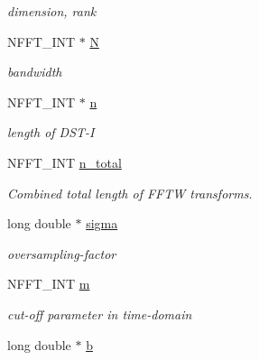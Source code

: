 \begin{DoxyCompactItemize}
\begin{DoxyCompactList}\small\item\em dimension, rank \end{DoxyCompactList}\item 
\hypertarget{structnfstl__plan_a8d9c4a80538b09056e0b2fdca9056042}{N\-F\-F\-T\-\_\-\-I\-N\-T $\ast$ \hyperlink{structnfstl__plan_a8d9c4a80538b09056e0b2fdca9056042}{N}}\label{structnfstl__plan_a8d9c4a80538b09056e0b2fdca9056042}

\begin{DoxyCompactList}\small\item\em bandwidth \end{DoxyCompactList}\item 
\hypertarget{structnfstl__plan_a9106781fac461a0c0b5e5699ba15cbf1}{N\-F\-F\-T\-\_\-\-I\-N\-T $\ast$ \hyperlink{structnfstl__plan_a9106781fac461a0c0b5e5699ba15cbf1}{n}}\label{structnfstl__plan_a9106781fac461a0c0b5e5699ba15cbf1}

\begin{DoxyCompactList}\small\item\em length of D\-S\-T-\/\-I \end{DoxyCompactList}\item 
N\-F\-F\-T\-\_\-\-I\-N\-T \hyperlink{structnfstl__plan_a099a9e255702d2cac3ede9ad8ae43408}{n\-\_\-total}
\begin{DoxyCompactList}\small\item\em Combined total length of F\-F\-T\-W transforms. \end{DoxyCompactList}\item 
\hypertarget{structnfstl__plan_a3c50de01911ed86a66d15ecd79874e21}{long double $\ast$ \hyperlink{structnfstl__plan_a3c50de01911ed86a66d15ecd79874e21}{sigma}}\label{structnfstl__plan_a3c50de01911ed86a66d15ecd79874e21}

\begin{DoxyCompactList}\small\item\em oversampling-\/factor \end{DoxyCompactList}\item 
\hypertarget{structnfstl__plan_a3875ac4f6250a94c17eb8eaf3f858673}{N\-F\-F\-T\-\_\-\-I\-N\-T \hyperlink{structnfstl__plan_a3875ac4f6250a94c17eb8eaf3f858673}{m}}\label{structnfstl__plan_a3875ac4f6250a94c17eb8eaf3f858673}

\begin{DoxyCompactList}\small\item\em cut-\/off parameter in time-\/domain \end{DoxyCompactList}\item 
\hypertarget{structnfstl__plan_a8378f952b6e05cd58225877eee84f2e7}{long double $\ast$ \hyperlink{structnfstl__plan_a8378f952b6e05cd58225877eee84f2e7}{b}}\label{structnfstl__plan_a8378f952b6e05cd58225877eee84f2e7}


\end{DoxyCompactItemize}
